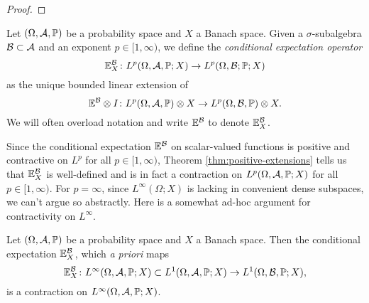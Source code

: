 \begin{proof}
\end{proof}



{\color{blue}
\begin{defn}
  Let $(\Omega,\mathcal{A},\mathbb{P})$ be a probability space and $X$ a Banach space.
  Given a $\sigma$-subalgebra $\mathcal{B} \subset \mathcal{A}$ and an exponent $p \in [1,\infty)$, we define the \emph{conditional expectation operator}
  \begin{equation*}
    \mathbb{E}_X^{\mathcal{B}} \colon L^p(\Omega,\mathcal{A},\mathbb{P};X) \rightarrow L^p(\Omega,\mathcal{B};\mathbb{P};X) 
  \end{equation*}
  as the unique bounded linear extension of
  \begin{equation*}
    \mathbb{E}^{\mathcal{B}} \otimes I \colon L^p(\Omega,\mathcal{A},\mathbb{P}) \otimes X \rightarrow L^p(\Omega,\mathcal{B},\mathbb{P}) \otimes X.
  \end{equation*}
  We will often overload notation and write $\mathbb{E}^{\mathcal{B}}$ to denote $\mathbb{E}_X^{\mathcal{B}}$.
\end{defn}
Since the conditional expectation $\mathbb{E}^{\mathcal{B}}$ on scalar-valued functions is positive and contractive on $L^p$ for all $p \in [1,\infty)$, Theorem \ref{thm:positive-extensions} tells us that $\mathbb{E}_X^{\mathcal{B}}$ is well-defined and is in fact a contraction on $L^p(\Omega,\mathcal{A},\mathbb{P};X)$ for all $p \in [1,\infty)$.
For $p = \infty$, since $L^\infty(\Omega;X)$ is lacking in convenient dense subspaces, we can't argue so abstractly.
Here is a somewhat ad-hoc argument for contractivity on $L^\infty$.

\begin{prop}
  Let $(\Omega,\mathcal{A},\mathbb{P})$ be a probability space and $X$ a Banach space.
  Then the conditional expectation $\mathbb{E}_X^{\mathcal{B}}$, which \emph{a priori} maps
  \begin{equation*}
    \mathbb{E}_X^{\mathcal{B}} \colon L^\infty(\Omega,\mathcal{A},\mathbb{P};X) \subset L^1(\Omega,\mathcal{A},\mathbb{P};X) \rightarrow L^1(\Omega,\mathcal{B},\mathbb{P};X),
  \end{equation*}
  is a contraction on $L^\infty(\Omega,\mathcal{A},\mathbb{P};X)$.
\end{prop}

}
